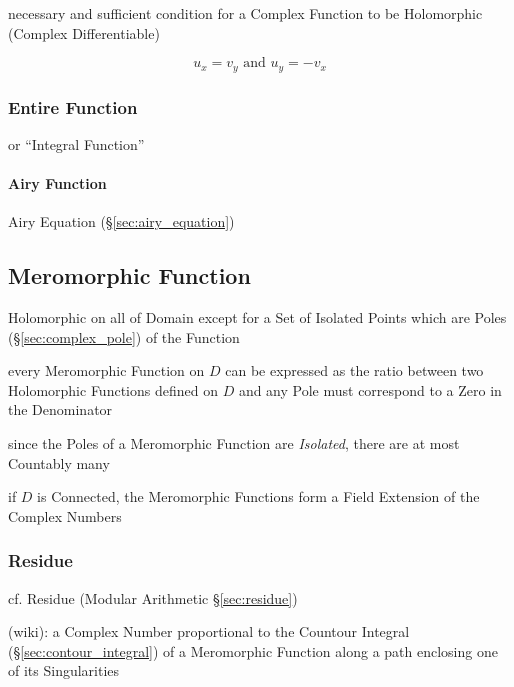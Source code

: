 necessary and sufficient condition for a Complex Function to be Holomorphic
(Complex Differentiable)

\[
  u_x = v_y \text{ and } u_y = - v_x
\]



\subsubsection{Entire Function}\label{sec:entire_function}

or ``Integral Function''



\paragraph{Airy Function}\label{sec:airy_function}\hfill

Airy Equation (\S\ref{sec:airy_equation})



\subsection{Meromorphic Function}\label{sec:meromorphic_function}

Holomorphic on all of Domain except for a Set of Isolated Points which are
Poles (\S\ref{sec:complex_pole}) of the Function

every Meromorphic Function on $D$ can be expressed as the ratio between two
Holomorphic Functions defined on $D$ and any Pole must correspond to a Zero in
the Denominator

since the Poles of a Meromorphic Function are \emph{Isolated}, there are at
most Countably many

if $D$ is Connected, the Meromorphic Functions form a Field Extension of the
Complex Numbers



\subsubsection{Residue}\label{sec:meromorphic_residue}

\fist cf. Residue (Modular Arithmetic \S\ref{sec:residue})

(wiki): a Complex Number proportional to the Countour Integral
(\S\ref{sec:contour_integral}) of a Meromorphic Function along a path enclosing
one of its Singularities

